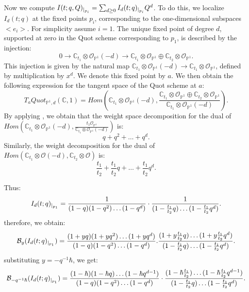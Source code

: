 \documentclass{amsart}
\begin{document}
Now we compute $I(t;q,Q)_{\arrowvert_{p_i}} = \sum_{d \geq 0} I_d(t;q)_{\arrowvert_{p_i}}Q^d$. To do this, we localize $I_d(t;q)$ at the fixed points $p_i$, corresponding to the one-dimensional subspaces $<e_i>$. For simplicity assume $i=1$. 
The unique fixed point of degree $d$, supported at zero in the Quot scheme corresponding to $p_1$, is described by the injection: 
\[
0 \to \mathbb{C}_{t_1}\otimes \mathcal{O}_{\mathbb{P}^1}(-d) \to \mathbb{C}_{t_1}\otimes \mathcal{O}_{\mathbb{P}^1} \oplus \mathbb{C}_{t_2}\otimes\mathcal{O}_{\mathbb{P}^1}.
\]
This injection is given by the natural map  $\mathbb{C}_{t_1}\otimes \mathcal{O}_{\mathbb{P}^1}(-d) \to \mathbb{C}_{t_1}\otimes \mathcal{O}_{\mathbb{P}^1}$, defined by multiplication by $x^d$. 
We denote this fixed point by $a$. We then obtain the following expression for the tangent space of the Quot scheme at $a$:
\[
    T_aQuot_{\mathbb{P}^1,d}(\mathbb{C},1) = Hom(\mathbb{C}_{t_1}\otimes \mathcal{O}_{\mathbb{P}^1}(-d),\frac{\mathbb{C}_{t_1}\otimes \mathcal{O}_{\mathbb{P}^1} \oplus \mathbb{C}_{t_2}\otimes\mathcal{O}_{\mathbb{P}^1}}{\mathbb{C}_{t_1}\otimes\mathcal{O}_{\mathbb{P}^1}(-d)}).
\]
By applying , we obtain that the weight space decomposition for the dual of $Hom(\mathbb{C}_{t_1}\otimes \mathcal{O}_{\mathbb{P}^1}(-d),\frac{t_1\mathcal{O}_{\mathbb{P}^1}}{\mathbb{C}_{t_1}\otimes \mathcal{O}_{\mathbb{P}^1}(-d)})$ is:
\[
q+q^2+\dots+q^d.
\]
Similarly, the weight decomposition for the dual of $Hom(\mathbb{C}_{t_1}\otimes \mathcal{O}(-d),\mathbb{C}_{t_2}\otimes \mathcal{O})$ is:
\[
    \frac{t_1}{t_2}+\frac{t_1}{t_2}q+\dots+\frac{t_1}{t_2}q^d.
\]

Thus:
\[
I_d(t;q)_{\arrowvert_{p_1}}=\frac{1}{(1-q)(1-q^2)\dots(1-q^d)}\cdot\frac{1}{(1-\frac{t_1}{t_2}q)\dots(1-\frac{t_1}{t_2}q^d)}.
\]
therefore, we obtain:
\begin{align*}
 \mathcal{B}_{y}(I_d(t;q)_{\arrowvert_{p_1}})= \frac{(1+yq)(1+yq^2)\dots(1+yq^d)}{(1-q)(1-q^2)\dots(1-q^d)}.\frac{(1+y\frac{t_1}{t_2}q)\dots(1+y\frac{t_1}{t_2}q^d)}{(1-\frac{t_1}{t_2}q)\dots(1-\frac{t_1}{t_2}q^d)}.
\end{align*}
substituting $y=-q^{-1}\hbar$, we get:
\begin{align*}
\mathcal{B}_{-q^{-1}\hbar}(I_d(t;q)_{\arrowvert_{p_1}}) = \frac{(1-\hbar)(1-\hbar q)\dots(1-\hbar q^{d-1})}{(1-q)(1-q^2)\dots(1-q^d)}\cdot\frac{(1-\hbar \frac{t_1}{t_2})\dots(1-\hbar \frac{t_1}{t_2}q^{d-1})}{(1-\frac{t_1}{t_2}q)\dots(1-\frac{t_1}{t_2}q^d)}.
\end{align*}
\end{document}
